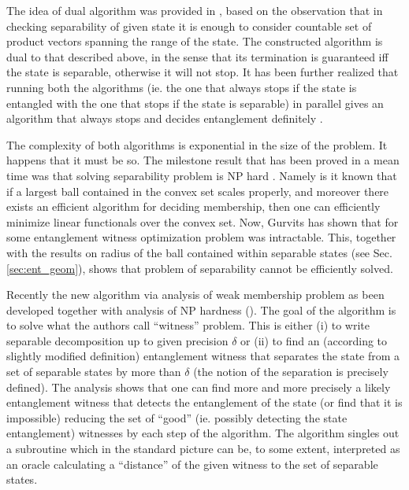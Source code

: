 \documentclass[rmp,12pt,preprint]{revtex4-2}
\begin{document}
The idea of dual algorithm was provided in \cite{HulpkeAlgorithm},
based on the observation that in checking separability of given state
it is enough to consider countable set of product vectors spanning the
range of the state. The constructed algorithm is dual to that
described above, in the sense that its termination is guaranteed iff
the state is separable, otherwise it will not stop.  It has been
further realized that running both the algorithms (ie.  the one that
always stops if the state is entangled with the one that stops if the
state is separable) in parallel gives an algorithm that always stops
and decides entanglement definitely \cite{HulpkeAlgorithm}.

The complexity of both algorithms is exponential in the size of the
problem. It happens that it must be so. The milestone result that has
been proved in a mean time was that solving separability problem is NP
hard \cite{GurvitzNPHard,Gurvits_match_2002,Gurvits_complex_2003}.
Namely is it known \cite{YudinN_complex_1976} that if a largest ball
contained in the convex set scales properly, and moreover there exists
an efficient algorithm for deciding membership, then one can
efficiently minimize linear functionals over the convex set.  Now,
Gurvits has shown that for some entanglement witness optimization
problem was intractable. This, together with the results on radius of
the ball contained within separable states (see
Sec. \ref{sec:ent_geom}), shows that problem of separability cannot be
efficiently solved.


Recently the new algorithm via analysis of weak membership problem as
been developed together with analysis of NP hardness
(\cite{IoannouAlgorithm1,IoannouAlgorithm2,IoannouAlgorithm3}). The
goal of the algorithm is to solve what the authors call ``witness''
problem.  This is either (i) to write separable decomposition up to
given precision $\delta$ or (ii) to find an (according to slightly
modified definition) entanglement witness that separates the state
from a set of separable states by more than $\delta$ (the notion of
the separation is precisely defined). The analysis shows that one can
find more and more precisely a likely entanglement witness that
detects the entanglement of the state (or find that it is impossible)
reducing the set of ``good'' (ie. possibly detecting the state
entanglement) witnesses by each step of the algorithm. The algorithm
singles out a subroutine which in the standard picture
\cite{sep1996,Terhal2000-laa} can be, to some extent, interpreted as
an oracle calculating a ``distance'' of the given witness to the set
of separable states.
\end{document}
